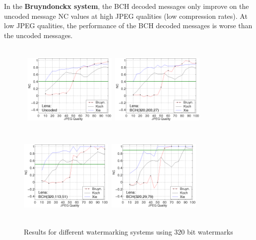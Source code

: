 \documentclass[10pt,twocolumn]{article}
\begin{document}
\normalsize
In the {\bf Bruyndonckx system}, 
	the BCH decoded messages only improve on the uncoded 
	message NC values at high JPEG qualities (low compression rates).
	At low JPEG qualities, the performance of
	the BCH decoded messages is worse than the uncoded messages.
\begin{figure}[!ht]
\setlength{\abovecaptionskip}{-0.25cm}
\centerline{ \hbox{
        \includegraphics[height=4.5cm,width=4.5cm]{Lena320_320_1.png}
        \includegraphics[height=4.5cm,width=4.5cm]{Lena320_203_27.png}
        \includegraphics[height=4.5cm,width=4.5cm]{Lena320_113_51.png}
        \includegraphics[height=4.5cm,width=4.5cm]{Lena320_29_79.png}
}} 
        \caption{Results for different watermarking systems using 320 bit watermarks}
        \label{fig:320BKX}
\setlength{\abovecaptionskip}{0cm}
\end{figure}
\end{document}
